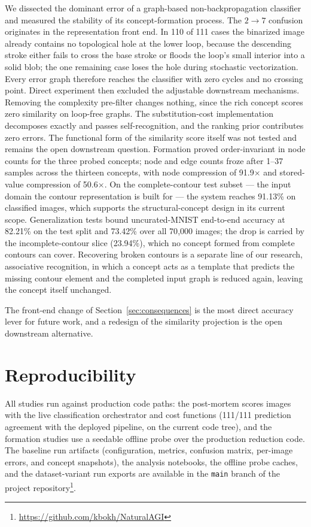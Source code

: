 \documentclass[conference]{IEEEtran}
\begin{document}
We dissected the dominant error of a graph-based non-backpropagation
classifier and measured the stability of its concept-formation process.
The $2{\to}7$ confusion originates in the representation front end. In
110 of 111 cases the binarized image already contains no topological hole
at the lower loop, because the descending stroke either fails to cross the
base stroke or floods the loop's small interior into a solid blob; the one
remaining case loses the hole during
stochastic vectorization. Every error graph therefore reaches the
classifier with zero cycles and no crossing point. Direct experiment then
excluded the adjustable downstream mechanisms. Removing the complexity
pre-filter
changes nothing, since the rich concept scores zero similarity on
loop-free graphs. The substitution-cost implementation decomposes exactly
and
passes self-recognition, and the ranking prior contributes zero errors.
The functional form of the similarity score itself was not tested and
remains the open downstream question.
Formation proved order-invariant in node counts for the three probed
concepts; node and edge counts froze
after 1--37 samples across the thirteen concepts, with node
compression of 91.9$\times$ and stored-value compression of 50.6$\times$.
On the complete-contour test subset --- the input domain the contour
representation is built for --- the system reaches 91.13\% on classified
images, which supports the structural-concept design in its current scope.
Generalization tests bound uncurated-MNIST end-to-end accuracy at 82.21\%
on the test
split and 73.42\% over all 70{,}000 images; the drop is carried by the
incomplete-contour slice (23.94\%), which no concept formed from complete
contours can cover. Recovering broken contours is a separate line of our
research, associative recognition, in which a concept acts as a template
that predicts the missing contour element and the completed input graph is
reduced again, leaving the concept itself unchanged.

The front-end change of Section~\ref{sec:consequences} is the most direct
accuracy lever for future work, and a redesign of the similarity
projection is the open downstream alternative.

\section*{Reproducibility}

All studies run against production code paths: the post-mortem scores
images with the live classification orchestrator and cost functions
(111/111 prediction agreement with the deployed pipeline, on the current
code tree), and the formation studies
use a seedable offline probe over the production reduction code. The
baseline run artifacts
(configuration, metrics, confusion matrix, per-image errors, and concept
snapshots), the analysis notebooks, the offline probe caches, and the
dataset-variant run exports are available in the \texttt{main} branch of
the project
repository\footnote{\url{https://github.com/kbokh/NaturalAGI}}.



\end{document}
